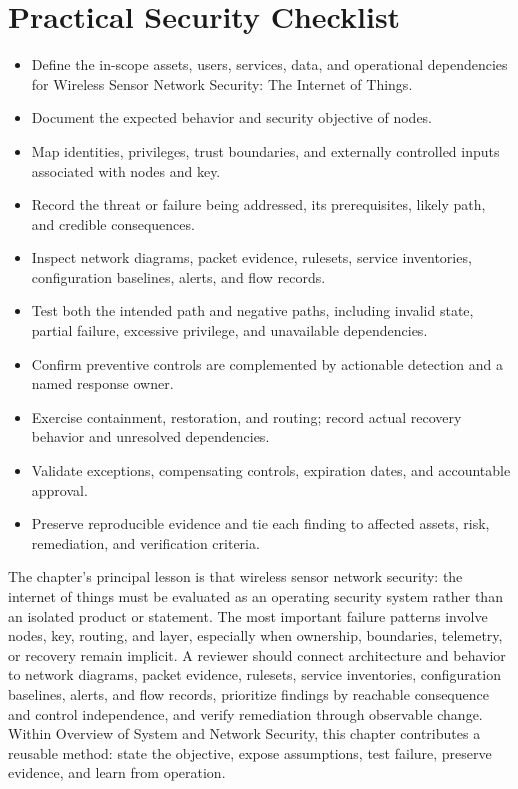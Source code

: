 \documentclass[11pt]{article}
\begin{document}
\section*{Practical Security Checklist}
\begin{itemize}[label=$\square$]
\item Define the in-scope assets, users, services, data, and operational dependencies for Wireless Sensor Network Security: The Internet of Things.
\item Document the expected behavior and security objective of nodes.
\item Map identities, privileges, trust boundaries, and externally controlled inputs associated with nodes and key.
\item Record the threat or failure being addressed, its prerequisites, likely path, and credible consequences.
\item Inspect network diagrams, packet evidence, rulesets, service inventories, configuration baselines, alerts, and flow records.
\item Test both the intended path and negative paths, including invalid state, partial failure, excessive privilege, and unavailable dependencies.
\item Confirm preventive controls are complemented by actionable detection and a named response owner.
\item Exercise containment, restoration, and routing; record actual recovery behavior and unresolved dependencies.
\item Validate exceptions, compensating controls, expiration dates, and accountable approval.
\item Preserve reproducible evidence and tie each finding to affected assets, risk, remediation, and verification criteria.
\end{itemize}
\begin{synthesisbox}
The chapter's principal lesson is that wireless sensor network security: the internet of things must be evaluated as an operating security system rather than an isolated product or statement. The most important failure patterns involve nodes, key, routing, and layer, especially when ownership, boundaries, telemetry, or recovery remain implicit. A reviewer should connect architecture and behavior to network diagrams, packet evidence, rulesets, service inventories, configuration baselines, alerts, and flow records, prioritize findings by reachable consequence and control independence, and verify remediation through observable change. Within Overview of System and Network Security, this chapter contributes a reusable method: state the objective, expose assumptions, test failure, preserve evidence, and learn from operation.
\end{synthesisbox}
\end{document}
